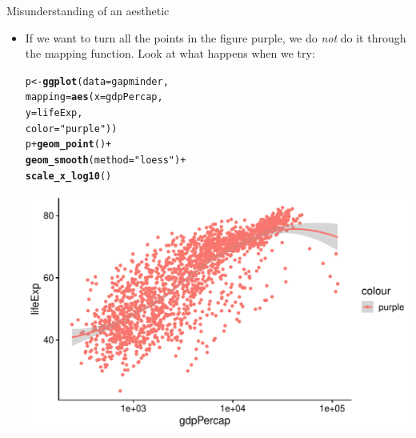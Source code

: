 \documentclass[10pt,handout]{beamer}\usepackage[]{graphicx}\usepackage[]{color}
\makeatletter
\def\maxwidth{ %
  \ifdim\Gin@nat@width>\linewidth
    \linewidth
  \else
    \Gin@nat@width
  \fi
}
\newcommand{\hlstr}[1]{\textcolor[rgb]{0.192,0.494,0.8}{#1}}%
\newcommand{\hlopt}[1]{\textcolor[rgb]{0,0,0}{#1}}%
\newcommand{\hlstd}[1]{\textcolor[rgb]{0.345,0.345,0.345}{#1}}%
\newcommand{\hlkwb}[1]{\textcolor[rgb]{0.69,0.353,0.396}{#1}}%
\newcommand{\hlkwc}[1]{\textcolor[rgb]{0.333,0.667,0.333}{#1}}%
\newcommand{\hlkwd}[1]{\textcolor[rgb]{0.737,0.353,0.396}{\textbf{#1}}}%
\newenvironment{kframe}{%
 \def\at@end@of@kframe{}%
 \ifinner\ifhmode%
  \def\at@end@of@kframe{\end{minipage}}%
  \begin{minipage}{\columnwidth}%
 \fi\fi%
 \def\FrameCommand##1{\hskip\@totalleftmargin \hskip-\fboxsep
 \colorbox{shadecolor}{##1}\hskip-\fboxsep
     \hskip-\linewidth \hskip-\@totalleftmargin \hskip\columnwidth}%
 \MakeFramed {\advance\hsize-\width
   \@totalleftmargin\z@ \linewidth\hsize
   \@setminipage}}%
 {\par\unskip\endMakeFramed%
 \at@end@of@kframe}
\newenvironment{knitrout}{}{} %
\makeatother
\begin{document}
\begin{frame}[fragile]{Misunderstanding of an aesthetic}
	\begin{itemize}
		\item If we want to turn all the points in the figure purple, we do \textit{not} do it through the mapping function. Look at what happens when we try:
\begin{knitrout}\tiny
{}\color{fgcolor}\begin{kframe}
\begin{alltt}
\hlstd{p} \hlkwb{<-} \hlkwd{ggplot}\hlstd{(}\hlkwc{data} \hlstd{= gapminder,}
                        \hlkwc{mapping} \hlstd{=} \hlkwd{aes}\hlstd{(}\hlkwc{x} \hlstd{= gdpPercap,}
                        \hlkwc{y} \hlstd{= lifeExp,}
                        \hlkwc{color} \hlstd{=} \hlstr{"purple"}\hlstd{))}
\hlstd{p} \hlopt{+} \hlkwd{geom_point}\hlstd{()} \hlopt{+}
        \hlkwd{geom_smooth}\hlstd{(}\hlkwc{method} \hlstd{=} \hlstr{"loess"}\hlstd{)} \hlopt{+}
        \hlkwd{scale_x_log10}\hlstd{()}
\end{alltt}
\end{kframe}

{\centering \includegraphics[width=\maxwidth]{figure/unnamed-chunk-12-1} 

}


\end{knitrout}
	\end{itemize}
	
\end{frame}
\end{document}
